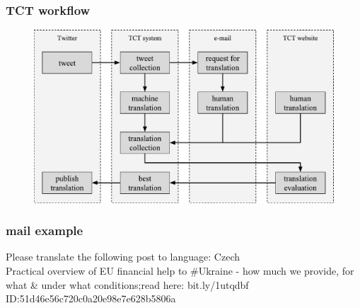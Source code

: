 \documentclass[12pt]{beamer}
\begin{document}
\begin{frame}
	\frametitle{TCT workflow}
	\begin{center}
		\begin{figure}
			\includegraphics[width=\textwidth]{diagram}
		\end{figure}
	\end{center}
\end{frame}

\begin{frame}
	\frametitle{mail example}
	Please translate the following post to language: Czech
	\\[1cm]
	Practical overview of EU financial help to \#Ukraine - how much we provide, for what \& under what conditions;read here: bit.ly/1utqdbf
	\\[1cm]
	ID:51d46e56c720c0a20e98e7e628b5806a
\end{frame}
\end{document}
